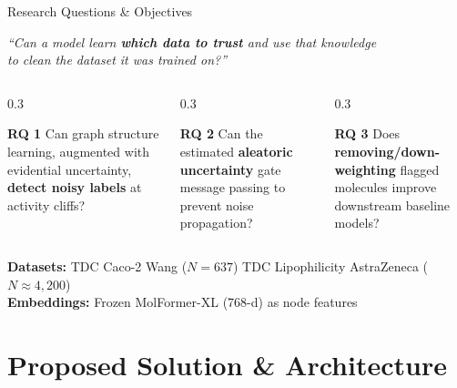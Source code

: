 \documentclass[aspectratio=169]{beamer}
\begin{document}
\begin{frame}{Research Questions \& Objectives}
\begin{center}
\large\color{navyblue}
\textit{``Can a model learn \textbf{which data to trust} and use that knowledge\\
to clean the dataset it was trained on?''}
\end{center}
\vspace{10pt}
\begin{columns}[T]
\begin{column}{0.3\textwidth}
\begin{block}{\centering \textbf{RQ 1}}
\centering Can graph structure learning, augmented with evidential uncertainty, \textbf{detect noisy labels} at activity cliffs?
\end{block}
\end{column}
\begin{column}{0.3\textwidth}
\begin{block}{\centering \textbf{RQ 2}}
\centering Can the estimated \textbf{aleatoric uncertainty} gate message passing to prevent noise propagation?
\end{block}
\end{column}
\begin{column}{0.3\textwidth}
\begin{block}{\centering \textbf{RQ 3}}
\centering Does \textbf{removing/down-weighting} flagged molecules improve downstream baseline models?
\end{block}
\end{column}
\end{columns}
\vspace{10pt}
\begin{center}
\textbf{Datasets:} TDC Caco-2 Wang ($N=637$) \quad \textbullet \quad TDC Lipophilicity AstraZeneca ($N{\approx}4{,}200$)\\[2pt]
\textbf{Embeddings:} Frozen MolFormer-XL (768-d) as node features
\end{center}
\end{frame}

\section{Proposed Solution \& Architecture}
\end{document}
